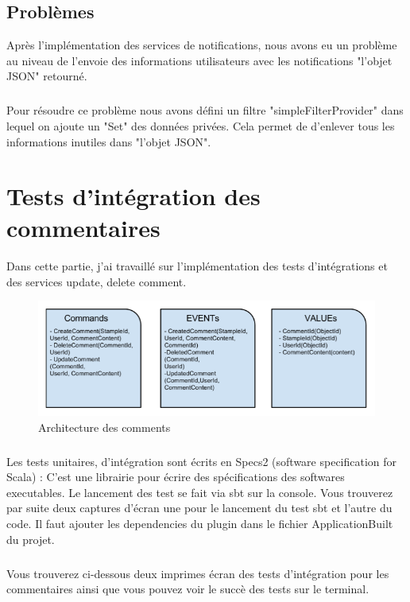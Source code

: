 \subsection{Problèmes}
Après l'implémentation des services de notifications, nous avons eu un problème au niveau de l'envoie des informations utilisateurs avec les notifications "l'objet JSON" retourné.
\subparagraph{}
Pour résoudre ce problème nous avons défini un filtre "simpleFilterProvider" dans lequel on ajoute un "Set" des données privées. Cela permet de d'enlever tous les informations inutiles dans "l'objet JSON".


\section{Tests d'intégration des commentaires}
\paragraph{}
Dans cette partie, j'ai travaillé sur l'implémentation des tests d'intégrations et des services update, delete comment.
\begin{figure}[H]
        \centering
                \centering
                \includegraphics[width=\textwidth]{Comment.png}
               \caption{Architecture des comments}
		\label{fig:Design des commentaires}
\end{figure}
\subparagraph{}
Les tests unitaires, d'intégration sont écrits en Specs2 (software specification for Scala) : C'est une librairie pour écrire des spécifications des softwares executables. Le lancement des test se fait via sbt sur la console.
Vous trouverez par suite deux captures d'écran une pour le lancement du test sbt et l'autre du code.
Il faut ajouter les dependencies du plugin dans le fichier ApplicationBuilt du projet.
\newpage
\subparagraph{}
Vous trouverez ci-dessous deux imprimes écran des tests d'intégration pour les commentaires ainsi que vous pouvez voir le succè des tests sur le terminal.
